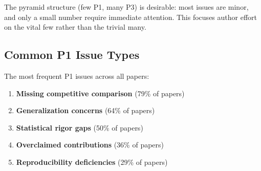 The pyramid structure (few P1, many P3) is desirable: most issues are minor, and only a small number require immediate attention. This focuses author effort on the vital few rather than the trivial many.

\subsection{Common P1 Issue Types}

The most frequent P1 issues across all papers:

\begin{enumerate}
    \item \textbf{Missing competitive comparison} (79\% of papers)
    \item \textbf{Generalization concerns} (64\% of papers)
    \item \textbf{Statistical rigor gaps} (50\% of papers)
    \item \textbf{Overclaimed contributions} (36\% of papers)
    \item \textbf{Reproducibility deficiencies} (29\% of papers)
\end{enumerate}
